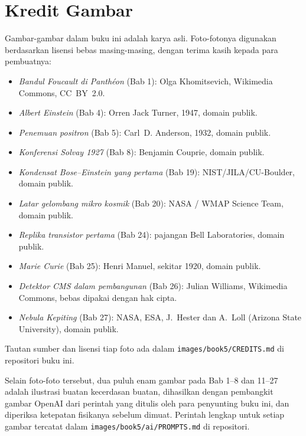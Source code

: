 \chapter*{Kredit Gambar}

Gambar-gambar dalam buku ini adalah karya asli. Foto-fotonya digunakan
berdasarkan lisensi bebas masing-masing, dengan terima kasih kepada para
pembuatnya:

\begin{itemize}
  \item \emph{Bandul Foucault di Panthéon} (Bab 1): Olga
        Khomitsevich, Wikimedia Commons, CC~BY~2.0.
  \item \emph{Albert Einstein} (Bab 4): Orren Jack Turner, 1947,
        domain publik.
  \item \emph{Penemuan positron} (Bab 5): Carl~D. Anderson, 1932,
        domain publik.
  \item \emph{Konferensi Solvay 1927} (Bab 8): Benjamin Couprie,
        domain publik.
  \item \emph{Kondensat Bose--Einstein yang pertama} (Bab 19):
        NIST/JILA/CU-Boulder, domain publik.
  \item \emph{Latar gelombang mikro kosmik} (Bab 20):
        NASA / WMAP Science Team, domain publik.
  \item \emph{Replika transistor pertama} (Bab 24): pajangan Bell
        Laboratories, domain publik.
  \item \emph{Marie Curie} (Bab 25): Henri Manuel, sekitar 1920,
        domain publik.
  \item \emph{Detektor CMS dalam pembangunan} (Bab 26): Julian
        Williams, Wikimedia Commons, bebas dipakai dengan hak cipta.
  \item \emph{Nebula Kepiting} (Bab 27): NASA, ESA, J.~Hester dan
        A.~Loll (Arizona State University), domain publik.
\end{itemize}

Tautan sumber dan lisensi tiap foto ada dalam
\texttt{images/book5/CREDITS.md} di repositori buku ini.

\bigskip
Selain foto-foto tersebut, dua puluh enam gambar pada Bab 1--8 dan
11--27 adalah ilustrasi buatan kecerdasan buatan, dihasilkan dengan
pembangkit gambar OpenAI dari perintah yang ditulis oleh para
penyunting buku ini, dan diperiksa ketepatan fisikanya sebelum
dimuat. Perintah lengkap untuk setiap gambar tercatat dalam
\texttt{images/book5/ai/PROMPTS.md} di repositori.
\clearpage
